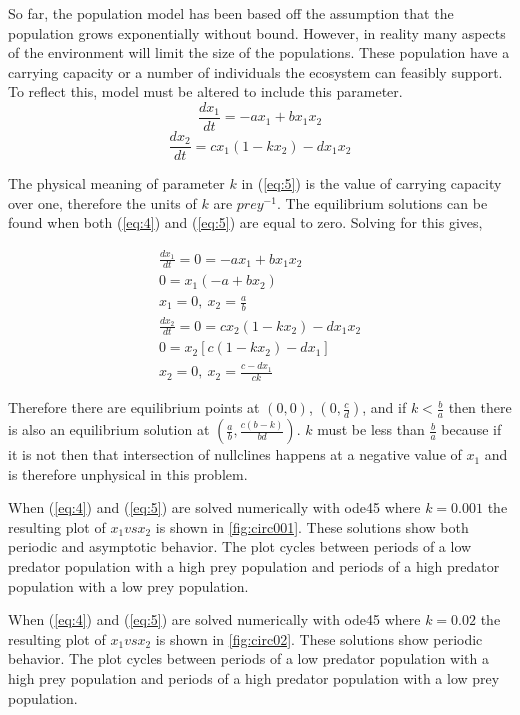 \documentclass[12pt]{article}   %
\theoremstyle{definition}
\numberwithin{equation}{section}
\begin{document}
\quad So far, the population model has been based off the assumption that the population grows exponentially without bound. However, in reality many aspects of the environment will limit the size of the populations. These population have a carrying capacity or a number of individuals the ecosystem can feasibly support. To reflect this, model must be altered to include this parameter.    
\begin{equation}
  \frac{dx_1}{dt} = -ax_1 + bx_1x_2
  \label{eq:4}
\end{equation}
\begin{equation}
  \frac{dx_2}{dt}= cx_1(1-kx_2) - dx_1x_2 
  \label{eq:5}
\end{equation}

\quad The physical meaning of parameter $k$ in (\ref{eq:5}) is the value of carrying capacity over one, therefore the units of $k$ are $prey^{-1}$.  The equilibrium solutions can be found when both (\ref{eq:4}) and (\ref{eq:5}) are equal to zero.  Solving for this gives,

\begin{align*}
  \frac{dx_1}{dt} =0= -ax_1 + bx_1x_2\\
  0=x_1(-a+bx_2)\\
  x_1=0,\ x_2=\frac{a}{b}\\
  \frac{dx_2}{dt}=0= cx_2(1-kx_2) - dx_1x_2\\
  0=x_2[c(1-kx_2)-dx_1]\\
  x_2=0,\ x_2=\frac{c-dx_1}{ck}
\end{align*}

\quad Therefore there are equilibrium points at $(0,0)$, $(0,\frac{c}{d})$, and if $k<\frac{b}{a}$ then there is also an equilibrium solution at $(\frac{a}{b},\frac{c(b-k)}{bd})$. $k$ must be less than $\frac{b}{a}$ because if it is not then that intersection of nullclines happens at a negative value of $x_1$ and is therefore unphysical in this problem.

\quad When (\ref{eq:4}) and (\ref{eq:5}) are solved numerically with ode45 where $k=0.001$ the resulting plot of $x_1 vs x_2$ is shown in \autoref{fig:circ001}.  These solutions show both periodic and asymptotic behavior. The plot cycles between periods of a low predator population with a high prey population and periods of a high predator population with a low prey population. 

\quad When (\ref{eq:4}) and (\ref{eq:5}) are solved numerically with ode45 where $k=0.02$ the resulting plot of $x_1 vs x_2$ is shown in \autoref{fig:circ02}.  These solutions show periodic behavior. The plot cycles between periods of a low predator population with a high prey population and periods of a high predator population with a low prey population. 
\end{document}

